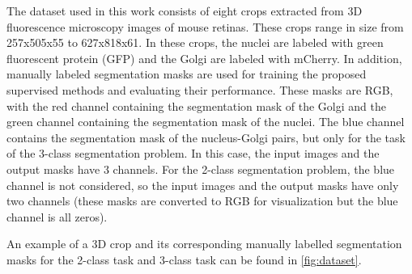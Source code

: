 The dataset used in this work consists of eight crops extracted from \ac{3D} fluorescence microscopy images of mouse retinas. These crops range in size from 257x505x55 to 627x818x61. In these crops, the nuclei are labeled with green fluorescent protein (GFP) and the Golgi are labeled with mCherry. In addition, manually labeled segmentation masks are used for training the proposed supervised methods and evaluating their performance. These masks are RGB, with the red channel containing the segmentation mask of the Golgi and the green channel containing the segmentation mask of the nuclei. The blue channel contains the segmentation mask of the nucleus-Golgi pairs, but only for the task of the 3-class segmentation problem. In this case, the input images and the output masks have 3 channels. For the 2-class segmentation problem, the blue channel is not considered, so the input images and the output masks have only two channels (these masks are converted to RGB for visualization but the blue channel is all zeros).

An example of a 3D crop and its corresponding manually labelled segmentation masks for the 2-class task and 3-class task can be found in \ref{fig:dataset}.

